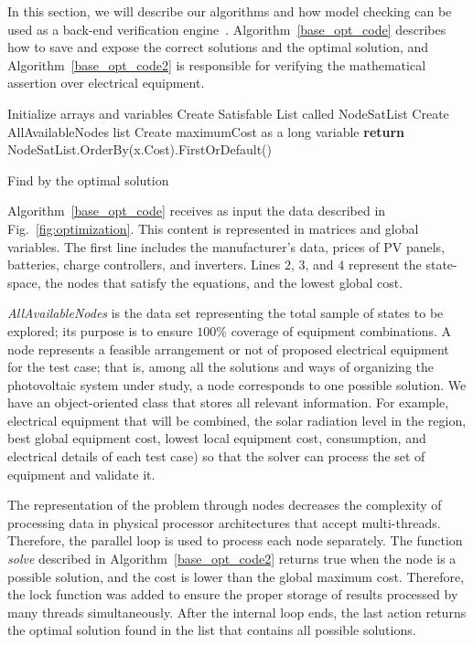 \documentclass[review]{elsarticle}
\begin{document}
In this section, we will describe our algorithms and how model checking can be used as a back-end verification engine~\citep{DBLP:journals/corr/abs-1909-13139}. Algorithm~\ref{base_opt_code} describes how to save and expose the correct solutions and the optimal solution, and Algorithm~\ref{base_opt_code2} is responsible for verifying the mathematical assertion over electrical equipment.

\begin{algorithm}[ht]
\SetAlgoLined
{}
Initialize arrays and variables\;
Create Satisfable List called NodeSatList\;
Create AllAvailableNodes list\;
Create maximumCost as a long variable\;
\textbf{return} NodeSatList.OrderBy(x.Cost).FirstOrDefault()
\caption{Find by the optimal solution}
\label{base_opt_code}
\end{algorithm}

Algorithm~\ref{base_opt_code} receives as input the data described in Fig.~\ref{fig:optimization}. This content is represented in matrices and global variables. The first line includes the manufacturer's data, prices of PV panels, batteries, charge controllers, and inverters. Lines $2$, $3$, and $4$ represent the state-space, the nodes that satisfy the equations, and the lowest global cost.

\textit{AllAvailableNodes} is the data set representing the total sample of states to be explored; its purpose is to ensure $100$\% coverage of equipment combinations. A node represents a feasible arrangement or not of proposed electrical equipment for the test case; that is, among all the solutions and ways of organizing the photovoltaic system under study, a node corresponds to one possible solution. We have an object-oriented class that stores all relevant information. For example, electrical equipment that will be combined, the solar radiation level in the region, best global equipment cost, lowest local equipment cost, consumption, and electrical details of each test case) so that the solver can process the set of equipment and validate it.

The representation of the problem through nodes decreases the complexity of processing data in physical processor architectures that accept multi-threads. Therefore, the parallel loop is used to process each node separately. The function \textit{solve} described in Algorithm~\ref{base_opt_code2} returns true when the node is a possible solution, and the cost is lower than the global maximum cost. Therefore, the lock function was added to ensure the proper storage of results processed by many threads simultaneously. After the internal loop ends, the last action returns the optimal solution found in the list that contains all possible solutions.
\end{document}
